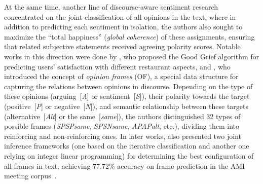 At the same time, another line of discourse-aware sentiment research
concentrated on the joint classification of all opinions in the text,
where in addition to predicting each sentiment in isolation, the
authors also sought to maximize the ``total happiness'' (\emph{global
  coherence}) of these assignments, ensuring that related subjective
statements received agreeing polarity scores.  Notable works in this
direction were done by , who proposed the Good Grief
algorithm for predicting users' satisfaction with different restaurant
aspects, and , who introduced
the concept of \emph{opinion frames} (OF), a special data structure
for capturing the relations between opinions in discourse.  Depending
on the type of these opinions (arguing~[\emph{A}] or
sentiment~[\emph{S}]), their polarity towards the target
(positive~[\emph{P}] or negative~[\emph{N}]), and semantic
relationship between these targets (alternative~[\emph{Alt}] or the
same~[\emph{same}]), the authors distinguished 32 types of possible
frames (\emph{SPSPsame}, \emph{SPSNsame}, \emph{APAPalt}, etc.),
dividing them into reinforcing and non-reinforcing ones.  In later
works,  also presented two
joint inference frameworks (one based on the iterative classification
and another one relying on integer linear programming) for determining
the best configuration of all frames in text, achieving 77.72\%
accuracy on frame prediction in the AMI meeting
corpus~\cite{Carletta:05}.



